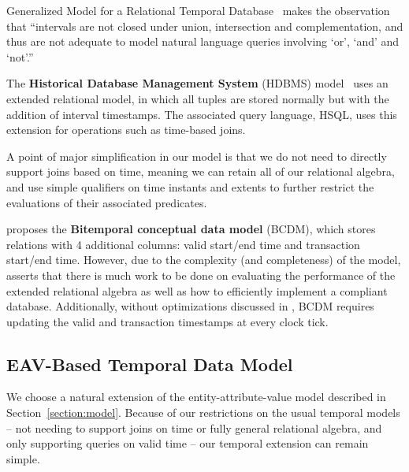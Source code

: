 Generalized Model for a Relational Temporal
Database~\cite{gadia1988generalized} makes the observation that ``intervals are
not closed under union, intersection and complementation, and thus are not
adequate to model natural language queries involving `or', `and' and `not'.''

The \textbf{Historical Database Management System} (HDBMS)
model~\cite{sarda1990extensions} uses an extended relational model, in which
all tuples are stored normally but with the addition of interval timestamps.
The associated query language, HSQL, uses this extension for operations such as
time-based joins. 

A point of major simplification in our model is that we do not need to directly
support joins based on time, meaning we can retain all of our relational
algebra, and use simple qualifiers on time instants and extents to further
restrict the evaluations of their associated predicates.

\cite{jensen1994unifying} proposes the \textbf{Bitemporal conceptual data
model} (BCDM), which stores relations with 4 additional columns: valid
start/end time and transaction start/end time. However, due to the complexity
(and completeness) of the model, \cite{jensen1999temporal} asserts that there
is much work to be done on evaluating the performance of the extended
relational algebra as well as how to efficiently implement a compliant
database. Additionally, without optimizations discussed in
\cite{jensen1999temporal}, BCDM requires updating the valid and transaction
timestamps at every clock tick.


\subsection{EAV-Based Temporal Data Model}

We choose a natural extension of the entity-attribute-value model described in Section~\ref{section:model}.
Because of our restrictions on the usual temporal models -- not needing to support joins on time or fully
general relational algebra, and only supporting queries on valid time -- our temporal extension can remain
simple.

